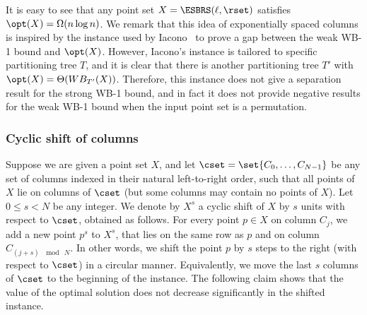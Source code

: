 \documentclass{toc}
\begin{document}
It is easy to see that any point set $X= \ESBRS(\ell, \rset)$ satisfies $\opt(X) = \Omega(n \log n)$.  
We remark that this idea of exponentially spaced columns is inspired by the instance used by Iacono~\cite{in_pursuit} to prove a gap between the weak WB-1 bound and $\opt(X)$.  
However, Iacono's instance is tailored to specific partitioning tree $T$, and it is clear that there is another partitioning tree $T'$ with $\opt(X) = \Theta(WB_{T'}(X))$.
Therefore, this instance does not give a separation result for the strong WB-1 bound, and in fact it does not provide negative results for the weak WB-1 bound when the input point set is a permutation.    



\subsubsection{Cyclic shift of columns}


Suppose we are given a point set $X$, and let $\cset=\set{C_0,\ldots,C_{N-1}}$ be any set of columns indexed in their natural left-to-right order, such that all points of $X$ lie on columns of $\cset$ (but some columns may contain no points of $X$).
Let $0\leq s<N$ be any integer. We denote by $X^s$ a cyclic shift of $X$ by $s$ units with respect to $\cset$, obtained as follows. 
For every point $p\in X$ on column $C_j$, we add a new point $p^s$ to $X^s$, that lies on the same row as $p$ and on column $C_{(j+s)~\mod~N}$.  
In other words, we shift the point $p$ by $s$ steps to the right (with respect to $\cset$) in a circular manner. Equivalently, we move the last $s$ columns of $\cset$ to the beginning of the instance.
The following claim shows that the value of the optimal solution does not decrease significantly in the shifted instance.
\end{document}
